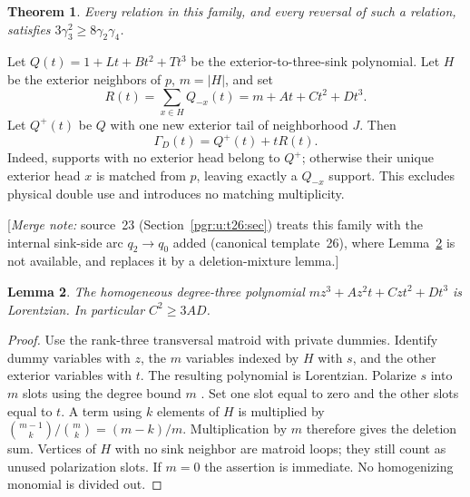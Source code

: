 \documentclass[11pt]{article}
\numberwithin{equation}{section}
\newtheorem{theorem}{Theorem}[section]\newtheorem{lemma}[theorem]{Lemma}\newtheorem{proposition}[theorem]{Proposition}\newtheorem{corollary}[theorem]{Corollary}
\theoremstyle{definition}\newtheorem{definition}[theorem]{Definition}\newtheorem{remark}[theorem]{Remark}
\newcommand{\Ga}{\Gamma}                   %
\newcommand{\mnote}[1]{[\textit{Merge note:} #1]}
\begin{document}
\begin{theorem}\label{pgr:u:d4:thm:star}
Every relation in this family, and every reversal of such a relation, satisfies
$3\gamma_3^2\ge8\gamma_2\gamma_4$.
\end{theorem}
Let $Q(t)=1+Lt+Bt^2+Tt^3$ be the exterior-to-three-sink polynomial. Let $H$ be the exterior neighbors of $p$, $m=|H|$, and set
\[
 R(t)=\sum_{x\in H}Q_{-x}(t)=m+At+Ct^2+Dt^3.
\]
Let $Q^+(t)$ be $Q$ with one new exterior tail of neighborhood $J$. Then
\begin{equation}\label{pgr:u:d4:eq:star}
 \Ga_D(t)=Q^+(t)+tR(t).
\end{equation}
Indeed, supports with no exterior head belong to $Q^+$; otherwise their unique exterior head $x$ is matched from $p$, leaving exactly a $Q_{-x}$ support. This excludes physical double use and introduces no matching multiplicity.


\mnote{source~23 (Section~\ref{pgr:u:t26:sec}) treats this family with
the internal sink-side arc $q_2\to q_0$ added (canonical template~26),
where Lemma~\ref{pgr:u:d4:lem:average} is not available, and replaces it
by a deletion-mixture lemma.}

\begin{lemma}\label{pgr:u:d4:lem:average}
The homogeneous degree-three polynomial $mz^3+Az^2t+Czt^2+Dt^3$ is Lorentzian. In particular $C^2\ge3AD$.
\end{lemma}
\begin{proof}
Use the rank-three transversal matroid with private dummies. Identify dummy variables with $z$, the $m$ variables indexed by $H$ with $s$, and the other exterior variables with $t$. The resulting polynomial is Lorentzian. Polarize $s$ into $m$ slots using the degree bound $m$ \cite[Proposition 3.1]{BH}. Set one slot equal to zero and the other slots equal to $t$. A term using $k$ elements of $H$ is multiplied by
$\binom{m-1}{k}/\binom mk=(m-k)/m$.
Multiplication by $m$ therefore gives the deletion sum. Vertices of $H$ with no sink neighbor are matroid loops; they still count as unused polarization slots. If $m=0$ the assertion is immediate. No homogenizing monomial is divided out.
\end{proof}
\end{document}
